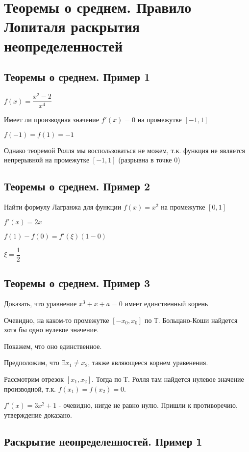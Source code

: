 \section{Теоремы о среднем. Правило Лопиталя раскрытия неопределенностей}

\subsection{Теоремы о среднем. Пример 1}

$ f(x) = \dfrac{x^{2} - 2}{x^{4}} $

Имеет ли производная значение $ f'(x) = 0 $ на промежутке $ [-1,1] $

$ f(-1) = f(1) = -1 $

Однако теоремой Ролля мы воспользоваться не можем, т.к. функция не является непрерывной на промежутке $ [-1,1] $
(разрывна в точке $ 0 $)

\subsection{Теоремы о среднем. Пример 2}

Найти формулу Лагранжа для функции $ f(x) = x^{2} $ на промежутке $ [0,1] $

$ f'(x) = 2x $

$ f(1) - f(0) = f'(\xi)(1-0)$

$ \xi = \dfrac{1}{2} $

\subsection{Теоремы о среднем. Пример 3}

Доказать, что уравнение $ x^{3} + x + a = 0 $ имеет единственный корень

Очевидно, на каком-то промежутке $ [-x_0, x_0] $ по Т. Больцано-Коши найдется хотя бы одно нулевое значение.

Покажем, что оно единственное.

Предположим, что $ \exists x_1 \ne x_2 $, также являющееся корнем уравенения.

Рассмотрим отрезок $ [x_1, x_2] $. Тогда по Т. Ролля там найдется нулевое значение производной,
т.к. $ f(x_1) = f(x_2) = 0 $.

$ f'(x) = 3x^{2}+1 $ - очевидно, нигде не равно нулю. Пришли к противоречию, утверждение доказано.

\subsection{Раскрытие неопределенностей. Пример 1}

